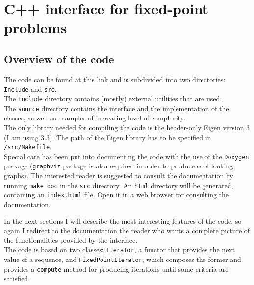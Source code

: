\documentclass[12pt]{article}
\begin{document}
					
		\section{C++ interface for fixed-point problems}
		\label{sec:C++}
		
		\subsection{Overview of the code}

		The code can be found at \href{https://github.com/martinoischia/Anderson-acceleration}{this link} and is subdivided into two directories:
		\verb|Include| and \verb|src|.\\
		The \verb|Include| directory contains (mostly) external utilities that
		are used.\\
		The \verb|source| directory contains the interface and the implementation of the classes, as well as
		examples of increasing level of complexity.\\
		The only library needed for compiling the code is the header-only \href{http://eigen.tuxfamily.org/}{Eigen}
		version 3 (I am using 3.3). The path of the Eigen library has to be specified in \verb|/src/Makefile|.\\
		Special care has been put into documenting the code with the use of the \verb|Doxygen| package 
		(\verb|graphviz| package is also required in order to produce cool looking graphs). The interested reader
		is suggested to consult the documentation by running \verb|make doc| in the \verb|src| directory.
		An \verb|html| directory will be generated, containing an \verb|index.html| file. Open it in a web browser for consulting the documentation.
		
		In the next sections I will describe the most interesting features of the code, so again I redirect to the documentation the reader
		who wants a complete picture of the functionalities provided by the interface.\\
		The code is based on two classes: \verb|Iterator|,
		a functor that provides the next value of a sequence, and
		\verb|FixedPointIterator|, which composes the former and
		provides a \verb|compute| method for producing iterations until some criteria are satisfied.
		
		
\end{document}
